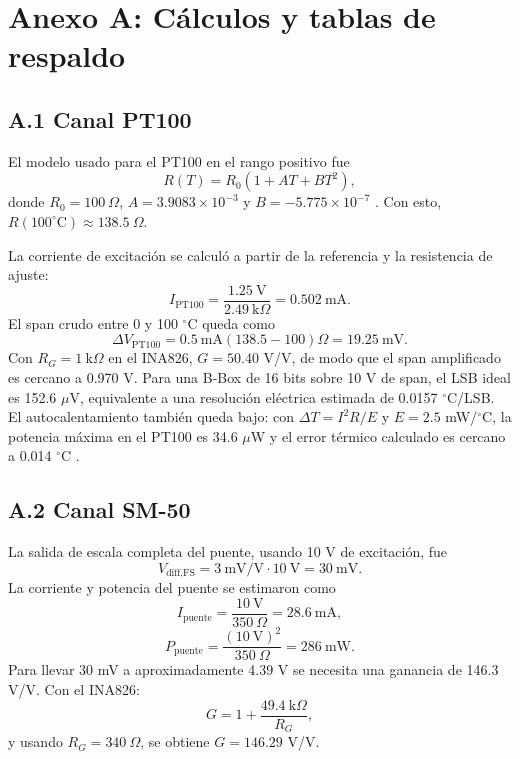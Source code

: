 \documentclass[conference]{IEEEtran}
\begin{document}
\section*{Anexo A: Cálculos y tablas de respaldo}

\subsection*{A.1 Canal PT100}

El modelo usado para el PT100 en el rango positivo fue
\begin{equation}
R(T)=R_0(1+AT+BT^2),
\end{equation}
donde $R_0=100~\Omega$, $A=3.9083\times10^{-3}$ y $B=-5.775\times10^{-7}$ \cite{bipm}. Con esto, $R(100^\circ\text{C})\approx138.5~\Omega$.

La corriente de excitación se calculó a partir de la referencia y la resistencia de ajuste:
\begin{equation}
I_{\text{PT100}}=\frac{1.25~\text{V}}{2.49~\text{k}\Omega}=0.502~\text{mA}.
\end{equation}
El span crudo entre 0 y 100 $^\circ$C queda como
\begin{equation}
\Delta V_{\text{PT100}}=0.5~\text{mA}(138.5-100)\Omega=19.25~\text{mV}.
\end{equation}
Con $R_G=1~\text{k}\Omega$ en el INA826, $G=50.40$ V/V, de modo que el span amplificado es cercano a 0.970 V. Para una B-Box de 16 bits sobre 10 V de span, el LSB ideal es 152.6 $\mu$V, equivalente a una resolución eléctrica estimada de 0.0157 $^\circ$C/LSB. El autocalentamiento también queda bajo: con $\Delta T=I^2R/E$ y $E=2.5$ mW/$^\circ$C, la potencia máxima en el PT100 es 34.6 $\mu$W y el error térmico calculado es cercano a 0.014 $^\circ$C \cite{ti_rtd}.

\subsection*{A.2 Canal SM-50}

La salida de escala completa del puente, usando 10 V de excitación, fue
\begin{equation}
V_{\text{diff,FS}}=3~\text{mV/V}\cdot10~\text{V}=30~\text{mV}.
\end{equation}
La corriente y potencia del puente se estimaron como
\begin{equation}
I_{\text{puente}}=\frac{10~\text{V}}{350~\Omega}=28.6~\text{mA},
\end{equation}
\begin{equation}
P_{\text{puente}}=\frac{(10~\text{V})^2}{350~\Omega}=286~\text{mW}.
\end{equation}
Para llevar 30 mV a aproximadamente 4.39 V se necesita una ganancia de 146.3 V/V. Con el INA826:
\begin{equation}
G=1+\frac{49.4~\text{k}\Omega}{R_G},
\end{equation}
y usando $R_G=340~\Omega$, se obtiene $G=146.29$ V/V.
\end{document}
